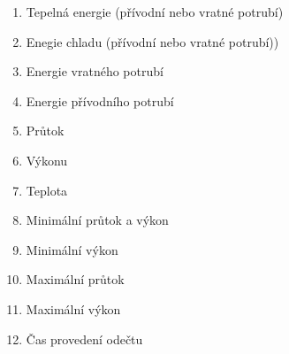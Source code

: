 	\begin{enumerate}
		\item Tepelná energie (přívodní nebo vratné potrubí)
		\item Enegie chladu (přívodní nebo vratné potrubí))
		\item Energie vratného potrubí
		\item Energie přívodního potrubí
		\item Průtok
		\item Výkonu
		\item Teplota
		\item Minimální průtok a výkon
		\item Minimální výkon
		\item Maximální průtok
		\item Maximální výkon
		\item Čas provedení odečtu
	\end{enumerate}

